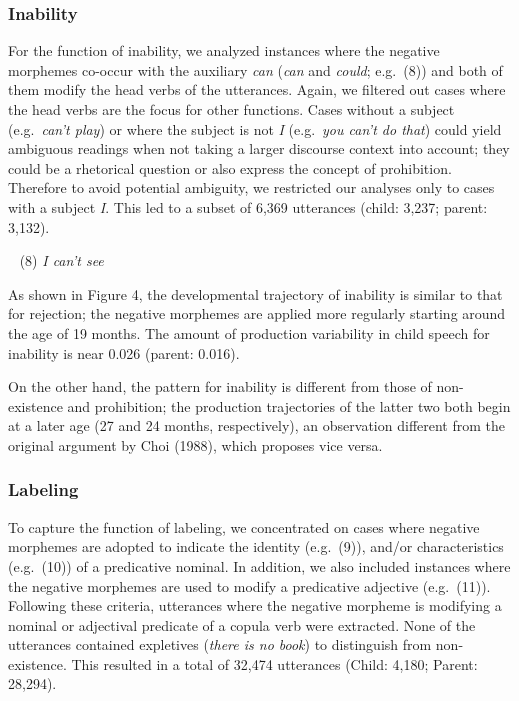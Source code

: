 \documentclass[10pt, letterpaper]{article}
\begin{document}
\hypertarget{inability}{%
\subsubsection{Inability}\label{inability}}

For the function of inability, we analyzed instances where the negative
morphemes co-occur with the auxiliary \emph{can} (\emph{can} and
\emph{could}; e.g.~(8)) and both of them modify the head verbs of the
utterances. Again, we filtered out cases where the head verbs are the
focus for other functions. Cases without a subject (e.g.~\emph{can't
play}) or where the subject is not \emph{I} (e.g.~\emph{you can't do
that}) could yield ambiguous readings when not taking a larger discourse
context into account; they could be a rhetorical question or also
express the concept of prohibition. Therefore to avoid potential
ambiguity, we restricted our analyses only to cases with a subject
\emph{I}. This led to a subset of 6,369 utterances (child: 3,237;
parent: 3,132).

~ (8) \emph{I can't see}

As shown in Figure 4, the developmental trajectory of inability is
similar to that for rejection; the negative morphemes are applied more
regularly starting around the age of 19 months. The amount of production
variability in child speech for inability is near 0.026 (parent: 0.016).

On the other hand, the pattern for inability is different from those of
non-existence and prohibition; the production trajectories of the latter
two both begin at a later age (27 and 24 months, respectively), an
observation different from the original argument by Choi (1988), which
proposes vice versa.

\hypertarget{labeling}{%
\subsubsection{Labeling}\label{labeling}}

To capture the function of labeling, we concentrated on cases where
negative morphemes are adopted to indicate the identity (e.g.~(9)),
and/or characteristics (e.g.~(10)) of a predicative nominal. In
addition, we also included instances where the negative morphemes are
used to modify a predicative adjective (e.g.~(11)). Following these
criteria, utterances where the negative morpheme is modifying a nominal
or adjectival predicate of a copula verb were extracted. None of the
utterances contained expletives (\emph{there is no book}) to distinguish
from non-existence. This resulted in a total of 32,474 utterances
(Child: 4,180; Parent: 28,294).
\end{document}

